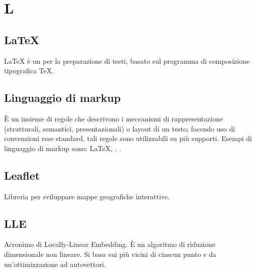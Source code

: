 \section*{L}
\markright{}
\subsection*{\LaTeX{}}
\LaTeX{} è un  per la preparazione di testi, basato sul programma di composizione tipografica \TeX{}.
\subsection*{Linguaggio di markup}
È un insieme di regole che descrivono i meccanismi di rappresentazione (strutturali, semantici, presentazionali) o layout di un testo; facendo uso di convenzioni rese standard, tali regole sono utilizzabili su più supporti. Esempi di linguaggio di markup sono: \LaTeX{}, , . 
\subsection*{Leaflet}
Libreria  per sviluppare mappe geografiche interattive.
\subsection*{LLE}
Acronimo di Locally-Linear Embedding. È un algoritmo di riduzione dimensionale non lineare. Si basa sui più vicini  di ciascun punto e da un'ottimizzazione ad autovettori. 